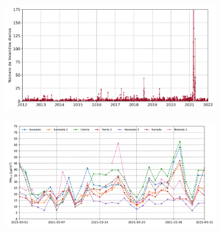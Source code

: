 \begin{figure}[H]
\begin{subfigure}{0.23\textwidth}
        \caption*{}
    \end{subfigure}
\end{figure}

\begin{figure}[H]
    \centering
    \changefontsizes{10pt}
    \begin{subfigure}{0.34\textwidth}
        \includegraphics[width=1\linewidth]{Graphics/Fire_Per_Day.png}
        \caption*{}
    \end{subfigure}
    \hspace*{0.2cm}
    \begin{subfigure}{0.34\textwidth}
        \includegraphics[width=1\linewidth]{Graphics/PM25.png}
        \caption*{}
    \end{subfigure}
    \hspace*{0.2cm}
    \begin{subfigure}{0.23\textwidth}

\end{subfigure}
\end{figure}

